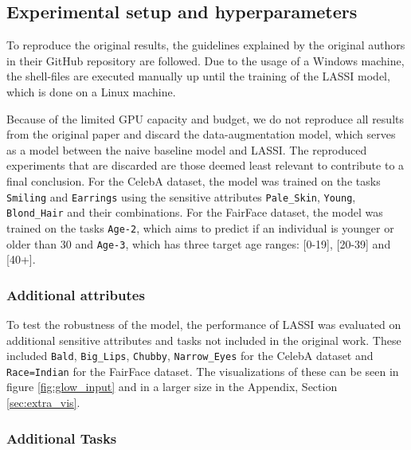 \subsection{Experimental setup and hyperparameters}\label{subsec: setup}

To reproduce the original results, the guidelines explained by the original authors in their GitHub repository \cite{peychev2022latent} are followed. Due to the usage of a Windows machine, the shell-files are executed manually up until the training of the LASSI model, which is done on a Linux machine. \newline

Because of the limited GPU capacity and budget, we do not reproduce all results from the original paper and discard the data-augmentation model, which serves as a model between the naive baseline model and LASSI. The reproduced experiments that are discarded are those deemed least relevant to contribute to a final conclusion. For the CelebA dataset, the model was trained on the tasks \texttt{Smiling} and \texttt{Earrings} using the sensitive attributes \texttt{Pale\_Skin}, \texttt{Young}, \texttt{Blond\_Hair} and their combinations. For the FairFace dataset, the model was trained on the tasks \texttt{Age-2}, which aims to predict if an individual is younger or older than 30 and \texttt{Age-3}, which has three target age ranges: [0-19], [20-39] and [40+].

\subsubsection{Additional attributes} To test the robustness of the model, the performance of LASSI was evaluated on additional sensitive attributes and tasks not included in the original work. These included \texttt{Bald}, \texttt{Big\_Lips}, \texttt{Chubby}, \texttt{Narrow\_Eyes} for the CelebA dataset and \texttt{Race=Indian} for the FairFace dataset. The visualizations of these can be seen in figure \ref{fig:glow_input} and in a larger size in the Appendix, Section \ref{sec:extra_vis}.


\subsubsection{Additional Tasks}

